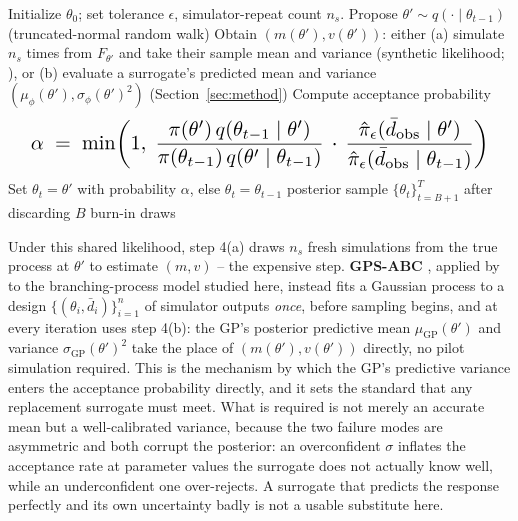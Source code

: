 \documentclass[sn-basic,iicol,pdflatex]{sn-jnl}
\newcommand{\dbar}{\ensuremath{\bar d}}
\begin{document}
\begin{algorithm}[H]
\caption{ABC-MCMC for $\theta=\log_{10}p$ (Metropolis--Hastings, synthetic likelihood)}
\label{alg:abcmcmc}
\begin{algorithmic}[1]
\State Initialize $\theta_0$; set tolerance $\epsilon$, simulator-repeat count $n_s$.
  \State Propose $\theta' \sim q(\cdot \mid \theta_{t-1})$ (truncated-normal random walk)
  \State Obtain $(m(\theta'), v(\theta'))$: either (a) simulate $n_s$ times from $F_{\theta'}$ and take their sample mean and variance (synthetic likelihood; \citealp{wood2010}), or (b) evaluate a surrogate's predicted mean and variance $(\mu_\phi(\theta'), \sigma_\phi(\theta')^2)$ (Section~\ref{sec:method})
  \State Compute acceptance probability
  \[
  \resizebox{0.95\linewidth}{!}{$\displaystyle\alpha \;=\; \min\!\left(1,\; \frac{\pi(\theta')\,q(\theta_{t-1}\mid\theta')}{\pi(\theta_{t-1})\,q(\theta'\mid\theta_{t-1})}\,\cdot\,\frac{\hat\pi_\epsilon(\dbar_{\mathrm{obs}} \mid \theta')}{\hat\pi_\epsilon(\dbar_{\mathrm{obs}} \mid \theta_{t-1})}\right)$}
  \]
  \State Set $\theta_t = \theta'$ with probability $\alpha$, else $\theta_t = \theta_{t-1}$
\EndFor
\State \Return posterior sample $\{\theta_t\}_{t=B+1}^{T}$ after discarding $B$ burn-in draws
\end{algorithmic}
\end{algorithm}

Under this shared likelihood, step 4(a) draws $n_s$ fresh simulations from the
true process at $\theta'$ to estimate $(m,v)$ -- the expensive step.
\textbf{GPS-ABC} \citep{meeds2014}, applied by \citet{lu2023} to the
branching-process model studied here, instead fits a Gaussian process to a
design $\{(\theta_i, \dbar_i)\}_{i=1}^n$ of simulator outputs \emph{once},
before sampling begins, and at every iteration uses step 4(b): the GP's
posterior predictive mean $\mu_{\mathrm{GP}}(\theta')$ and variance
$\sigma_{\mathrm{GP}}(\theta')^2$ take the place of $(m(\theta'), v(\theta'))$
directly, no pilot simulation required. This is the mechanism by which the
GP's predictive variance enters the acceptance probability directly, and it
sets the standard that any replacement surrogate must meet. What is required
is not merely an accurate mean but a well-calibrated variance, because the two
failure modes are asymmetric and both corrupt the posterior: an overconfident
$\sigma$ inflates the acceptance rate at parameter values the surrogate does
not actually know well, while an underconfident one over-rejects. A surrogate
that predicts the response perfectly and its own uncertainty badly is not a
usable substitute here.
\end{document}
